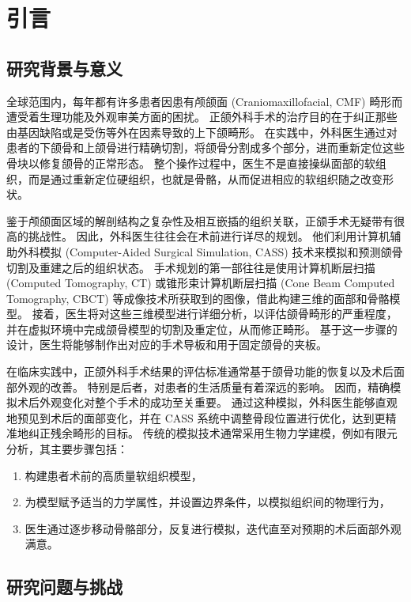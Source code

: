 \chapter{引言}

\section{研究背景与意义}

全球范围内，每年都有许多患者因患有颅颌面 (Craniomaxillofacial, CMF) 畸形而遭受着生理功能及外观审美方面的困扰。
正颌外科手术的治疗目的在于纠正那些由基因缺陷或是受伤等外在因素导致的上下颌畸形。
在实践中，外科医生通过对患者的下颌骨和上颌骨进行精确切割，将颌骨分割成多个部分，进而重新定位这些骨块以修复颌骨的正常形态。
整个操作过程中，医生不是直接操纵面部的软组织，而是通过重新定位硬组织，也就是骨骼，从而促进相应的软组织随之改变形状。

鉴于颅颌面区域的解剖结构之复杂性及相互嵌插的组织关联，正颌手术无疑带有很高的挑战性。
因此，外科医生往往会在术前进行详尽的规划。
他们利用计算机辅助外科模拟 (Computer-Aided Surgical Simulation, CASS) 技术来模拟和预测颌骨切割及重建之后的组织状态。
手术规划的第一部往往是使用计算机断层扫描 (Computed Tomography, CT) 或锥形束计算机断层扫描 (Cone Beam Computed Tomography, CBCT) 等成像技术所获取到的图像，借此构建三维的面部和骨骼模型。
接着，医生将对这些三维模型进行详细分析，以评估颌骨畸形的严重程度，并在虚拟环境中完成颌骨模型的切割及重定位，从而修正畸形。
基于这一步骤的设计，医生将能够制作出对应的手术导板和用于固定颌骨的夹板。

在临床实践中，正颌外科手术结果的评估标准通常基于颌骨功能的恢复以及术后面部外观的改善。
特别是后者，对患者的生活质量有着深远的影响。
因而，精确模拟术后外观变化对整个手术的成功至关重要。
通过这种模拟，外科医生能够直观地预见到术后的面部变化，并在 CASS 系统中调整骨段位置进行优化，达到更精准地纠正残余畸形的目标。
传统的模拟技术通常采用生物力学建模，例如有限元分析，其主要步骤包括：
\begin{enumerate}
  \item 构建患者术前的高质量软组织模型，
  \item 为模型赋予适当的力学属性，并设置边界条件，以模拟组织间的物理行为，
  \item 医生通过逐步移动骨骼部分，反复进行模拟，迭代直至对预期的术后面部外观满意。
\end{enumerate}

\section{研究问题与挑战}

